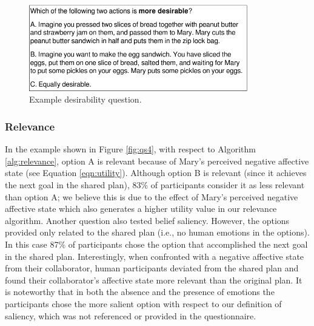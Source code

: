 \documentclass[12pt]{report}
\begin{document}
\begin{figure}[t]
  \centering
  \includegraphics[width=0.85\textwidth]{figure/question-sample3-croped.pdf}
  \caption{{Example desirability question.}}
  \label{fig:qs3}
\end{figure}

\subsubsection{Relevance}
\label{sec:relevance-crowdsourcing}
In the example shown in Figure \ref{fig:qs4}, with respect to Algorithm
\ref{alg:relevance}, option A is relevant because of Mary's perceived negative
affective state (see Equation \ref{eqn:utility}). Although option B is relevant
(since it achieves the next goal in the shared plan), 83\% of participants
consider it as less relevant than option A; we believe this is due to the effect
of Mary's perceived negative affective state which also generates a higher
utility value in our relevance algorithm. Another question also tested belief
saliency. However, the options provided only related to the shared plan (i.e.,
no human emotions in the options). In this case 87\% of participants chose the
option that accomplished the next goal in the shared plan. Interestingly, when
confronted with a negative affective state from their collaborator, human
participants deviated from the shared plan and found their collaborator's
affective state more relevant than the original plan. It is noteworthy that in
both the absence and the presence of emotions the participants chose the more
salient option with respect to our definition of saliency, which was not
referenced or provided in the questionnaire.
\end{document}
